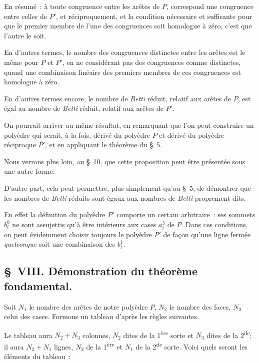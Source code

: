\documentclass{article}
\begin{document}
En résumé~: à toute congruence entre les arêtes de $P$, correspond une congruence entre celles de $P'$, et réciproquement, et la condition nécessaire et suffisante pour que le premier membre de l'une des congruences soit homologue à zéro, c'est que l'autre le soit.

En d'autres termes, le nombre des congruences distinctes entre les arêtes est le même pour $P$ et $P'$, en ne considérant pas des congruences comme distinctes, quand une combinaison linéaire des premiers membres de ces congruences est homologue à zéro.

En d'autres termes encore, le nombre de \emph{Betti} réduit, relatif aux arêtes de $P$, est égal au nombre de \emph{Betti} réduit, relatif aux arêtes de $P'$.

On pourrait arriver au même résultat, en remarquant que l'on peut construire un polyèdre qui serait, à la fois, dérivé du polyèdre $P$ et dérivé du polyèdre réciproque $P'$, et en appliquant le théorème du \S~5.

Nous verrons plus loin, au \S~10, que cette proposition peut être présentée sous une autre forme.

D'autre part, cela peut permettre, plus simplement qu'au \S~5, de démontrer que les nombres de \emph{Betti} réduits sont égaux aux nombres de \emph{Betti} proprement dits.

En effet la définition du polyèdre $P'$ comporte un certain arbitraire~: ses sommets $b^{0}_{i}$ ne sont assujettis qu'à être intérieurs aux cases $a^{3}_{i}$ de $P$. Dans ces conditions, on peut évidemment choisir toujours le polyèdre $P'$ de façon qu'une ligne fermée \emph{quelconque} soit une combinaison des $b^{1}_{i}$.

\subsection*{\S~VIII. Démonstration du théorème fondamental.}

Soit $N_{1}$ le nombre des arêtes de notre polyèdre $P$, $N_{2}$ le nombre des faces, $N_{3}$ celui des cases. Formons un tableau d'après les règles suivantes.


Le tableau aura $N_{2} + N_{3}$ colonnes, $N_{2}$ dites de la 1\textsuperscript{ère} sorte et $N_{3}$ dites de la 2\textsuperscript{de}; il aura $N_{2} + N_{1}$ lignes, $N_{2}$ de la 1\textsuperscript{ère} et $N_{1}$ de la 2\textsuperscript{de} sorte. Voici quels seront les éléments du tableau~:
\end{document}
